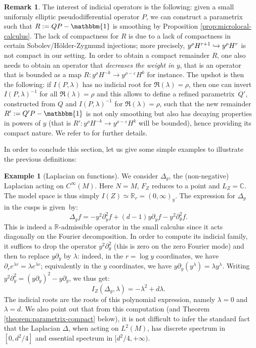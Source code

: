 \documentclass[JEP,XML,SOM,Unicode,NoFloatCountersInSection]{cedram}
\newcommand\hto{\mathrel{\lhook\joinrel\to}}
\newcommand{\C}{\mathbb{C}}
\newcommand{\R}{\mathbb{R}}
\newcommand{\eps}{\varepsilon}
\theoremstyle{plain}
\theoremstyle{definition}
\newtheorem{example}{Example}[section]
\newtheorem{remark}{Remark}[section]
\begin{document}
\begin{remark}\label{remark:why-indicial}
The interest of indicial operators is the following: given a small uniformly elliptic pseudodifferential operator $P$, we can construct a parametrix such that $R := QP-\mathbbm{1}$ is smoothing by Proposition \ref{prop:microlocal-calculus}. The lack of compactness for $R$ is due to a lack of compactness in certain Sobolev/Hölder-Zygmund injections; more precisely, $y^\rho H^{r+1} \hto y^\rho H^r$ is not compact in our setting. In order to obtain a compact remainder $R$, one also needs to obtain an operator that \emph{decreases the weight in $y$}, that is an operator that is bounded as a map $R : y^\rho H^{-k} \to y^{\rho-\eps}H^k$ for instance. The upshot is then the following: if $I(P,\lambda)$ has no indicial root for $\Re(\lambda) = \rho$, then one can invert $I(P,\lambda)^{-1}$ for all $\Re(\lambda)=\rho$ and this allows to define a refined parametrix~$Q'$, constructed from $Q$ and $I(P,\lambda)^{-1}$ for $\Re(\lambda)=\rho$, such that the new remainder $R':=Q'P-\mathbbm{1}$ is not only smoothing but also has decaying properties in powers of $y$ (that is $R' : y^\rho H^{-k} \to y^{\rho-\eps} H^k$ will be bounded), hence providing its compact nature. We refer to \cite[\S 4.2.3]{Bonthonneau-Lefeuvre-19-1} for further details.
\end{remark}

In order to conclude this section, let us give some simple examples to illustrate the previous definitions:

\begin{example}[Laplacian on functions]
We consider $\Delta_g$, the (non-negative) Laplacian acting on $C^\infty(M)$. Here $N=M$, $F_Z$ reduces to a point and $L_Z = \C$. The model space is thus simply $I(Z) \simeq \R_r = (0,\infty)_y$. The expression for $\Delta_g$ in the cusps is given~by:
\[
\Delta_g f = -y^2 \partial^2_y f + (d-1) y \partial_y f - y^2 \partial^2_\theta f.
\]
This is indeed a $\R$-admissible operator in the small calculus since it acts diagonally on the Fourier decomposition. In order to compute its indicial family, it suffices to drop the operator $y^2 \partial^2_\theta$ (this is zero on the zero Fourier mode) and then to replace $y \partial_y$ by $\lambda$: indeed, in the $r=\log y$ coordinates, we have $\partial_r e^{\lambda r} = \lambda e^{\lambda r}$; equivalently in the $y$ coordinates, we have $y \partial_y (y^\lambda) = \lambda y^\lambda$. Writing $y^2\partial_y^2 = (y\partial_y)^2-y\partial_y$, we thus get:
\[
I_Z(\Delta_g,\lambda) = -\lambda^2 + d\lambda.
\]
The indicial roots are the roots of this polynomial expression, namely $\lambda = 0$ and $\lambda=d$. We also point out that from this computation (and Theorem \ref{theorem:parametrix-compact} below), it is not difficult to infer the standard fact that the Laplacian $\Delta$, when acting on $L^2(M)$, has discrete spectrum in $[0,d^2/4]$ and essential spectrum in $[d^2/4,+\infty)$.
\end{example}
\end{document}
